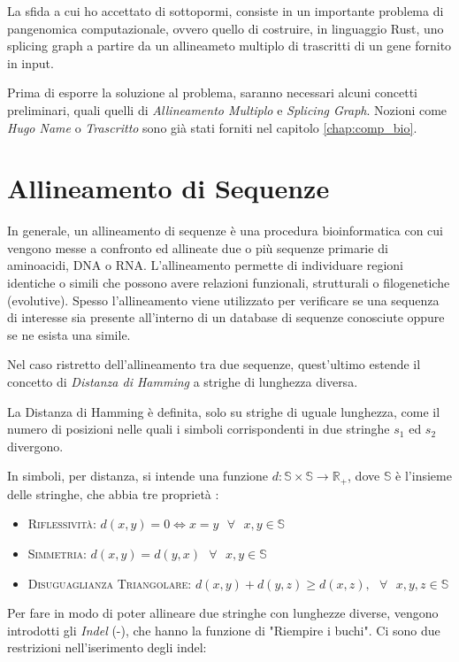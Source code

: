 La sfida a cui ho accettato di sottopormi, consiste in un importante problema di pangenomica computazionale, ovvero quello di costruire, in linguaggio Rust, uno splicing graph  a partire da un allineameto multiplo di trascritti di un gene fornito in input. 

Prima di esporre la soluzione al problema, saranno necessari alcuni concetti preliminari, quali quelli di \textit{Allineamento Multiplo} e \textit{Splicing Graph}. Nozioni come \textit{Hugo Name} o \textit{Trascritto} sono già stati forniti nel capitolo \ref{chap:comp_bio}.

\section{Allineamento di Sequenze}
In generale, un allineamento di sequenze è una procedura bioinformatica con cui vengono messe a confronto ed allineate due o più sequenze primarie di aminoacidi, DNA o RNA. L'allineamento permette di individuare regioni identiche o simili che possono avere relazioni funzionali, strutturali o filogenetiche (evolutive). Spesso l'allineamento viene utilizzato per verificare se una sequenza di interesse sia presente all'interno di un database di sequenze conosciute oppure se ne esista una simile. 

Nel caso ristretto dell'allineamento tra due sequenze, quest'ultimo estende il concetto di \textit{Distanza di Hamming} a strighe di lunghezza diversa.

La Distanza di Hamming è definita, solo su strighe di uguale lunghezza, come il numero di posizioni nelle quali i simboli corrispondenti in due stringhe $s_1$ ed $s_2$ divergono. 

In simboli, per distanza, si intende una funzione $d: \mathbb{S}\times \mathbb{S} \to \mathbb{R_+}$, dove $\mathbb{S}$ è l'insieme delle stringhe, che abbia tre proprietà : 

\begin{itemize}
    \item \textsc{Riflessività:} $d(x,y)=0 \iff x=y \textrm{ } \forall \textrm{ } x,y \in \mathbb{S}$
    \item \textsc{Simmetria:} $d(x,y)=d(y,x) \textrm{ } \forall \textrm{ } x,y \in \mathbb{S}$
    \item \textsc{Disuguaglianza Triangolare:} $d(x,y) +d(y,z)\geq d(x,z), \textrm{ } \forall \textrm{ } x,y,z \in \mathbb{S}$
\end{itemize}

Per fare in modo di poter allineare due stringhe con lunghezze diverse, vengono introdotti gli \textit{Indel} (-), che hanno la funzione di "Riempire i buchi". Ci sono due restrizioni nell'iserimento degli indel:

